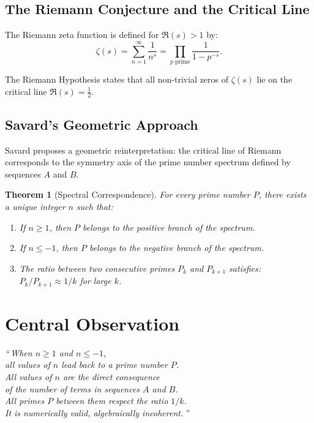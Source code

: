 \documentclass[12pt,a4paper]{article}
\newtheorem{theorem}{Theorem}
\begin{document}
\subsection{The Riemann Conjecture and the Critical Line}

The Riemann zeta function is defined for $\Re(s) > 1$ by:
\[
  \zeta(s) = \sum_{n=1}^{\infty} \frac{1}{n^s} = \prod_{p \text{ prime}} \frac{1}{1 - p^{-s}}.
\]

The Riemann Hypothesis states that all non-trivial zeros of $\zeta(s)$ lie on the
critical line $\Re(s) = \frac{1}{2}$.

\subsection{Savard's Geometric Approach}

Savard proposes a geometric reinterpretation: the critical line of Riemann corresponds
to the symmetry axis of the prime number spectrum defined by sequences $A$ and $B$.

\begin{theorem}[Spectral Correspondence]
For every prime number $P$, there exists a unique integer $n$ such that:
\begin{enumerate}
  \item If $n \geq 1$, then $P$ belongs to the positive branch of the spectrum.
  \item If $n \leq -1$, then $P$ belongs to the negative branch of the spectrum.
  \item The ratio between two consecutive primes $P_k$ and $P_{k+1}$ satisfies:
        $P_k / P_{k+1} \approx 1/k$ for large $k$.
\end{enumerate}
\end{theorem}

\section{Central Observation}

\begin{center}
\textit{``\,When $n \geq 1$ and $n \leq -1$,\\
all values of $n$ lead back to a prime number $P$.\\
All values of $n$ are the direct consequence\\
of the number of terms in sequences $A$ and $B$.\\
All primes $P$ between them respect the ratio $1/k$.\\
It is numerically valid, algebraically incoherent.\,''}
\end{center}
\end{document}
